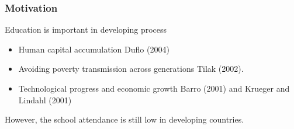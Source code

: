 \documentclass{beamer}
\begin{document}

    





\begin{frame}
\frametitle{Motivation}
Education is important in developing process
\begin{itemize}
    \item Human capital accumulation \textcolor{mygray}{Duflo (2004)}
    \item Avoiding poverty transmission across generations \textcolor{mygray}{Tilak (2002)}.
    \item Technological progress and economic growth \textcolor{mygray}{Barro (2001) and Krueger and Lindahl (2001)}
\end{itemize}
\pause
\bigskip
\bigskip
However, the school attendance is still low in developing countries. 

\end{frame}
\end{document}
